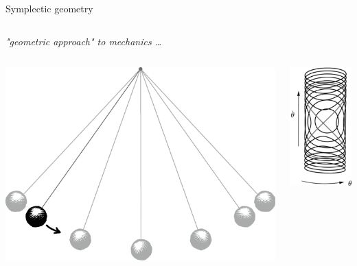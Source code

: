\documentclass[beamer,10pt]{standalone}
\begin{document}
\begin{frame}{Symplectic geometry}
\begin{columns}[T]
	\begin{column}{.50\linewidth}
		\centering
		\textit{ "geometric approach" to mechanics \dots}
		\begin{columns}
			\begin{column}{.50\linewidth}
				\begin{center}
					\includegraphics[width=0.8\linewidth]{Pictures/pendulum13}			
				\end{center}
			\end{column}	
			\begin{column}{.50\linewidth}
				\begin{center}
					\includegraphics[width=0.45\linewidth]{Pictures/pendulum-phase-space}			

\end{center}
\end{column}
\end{columns}
\end{column}
\end{columns}
\end{frame}
\end{document}
